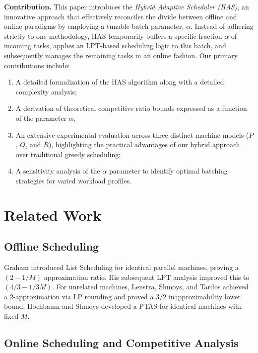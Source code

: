 \documentclass[conference]{IEEEtran}
\begin{document}
\textbf{Contribution.} This paper introduces the \emph{Hybrid Adaptive Scheduler (HAS)}, an innovative approach that effectively reconciles the divide between offline and online paradigms by employing a tunable batch parameter, $\alpha$. Instead of adhering strictly to one methodology, HAS temporarily buffers a specific fraction $\alpha$ of incoming tasks, applies an LPT-based scheduling logic to this batch, and subsequently manages the remaining tasks in an online fashion. Our primary contributions include:
\begin{enumerate}
    \item A detailed formalization of the HAS algorithm along with a detailed complexity analysis;
    \item A derivation of theoretical competitive ratio bounds expressed as a function of the parameter $\alpha$;
    \item An extensive experimental evaluation across three distinct machine models ($P$, $Q$, and $R$), highlighting the practical advantages of our hybrid approach over traditional greedy scheduling;
    \item A sensitivity analysis of the $\alpha$ parameter to identify optimal batching strategies for varied workload profiles.
\end{enumerate}

\section{Related Work}

\subsection{Offline Scheduling}

Graham \cite{graham1966} introduced List Scheduling for identical parallel machines, proving a $(2 - 1/M)$ approximation ratio. His subsequent LPT analysis \cite{graham1969} improved this to $(4/3 - 1/3M)$. For unrelated machines, Lenstra, Shmoys, and Tardos \cite{lenstra1990} achieved a 2-approximation via LP rounding and proved a $3/2$ inapproximability lower bound. Hochbaum and Shmoys \cite{hochbaum1987} developed a PTAS for identical machines with fixed $M$.

\subsection{Online Scheduling and Competitive Analysis}
\end{document}
